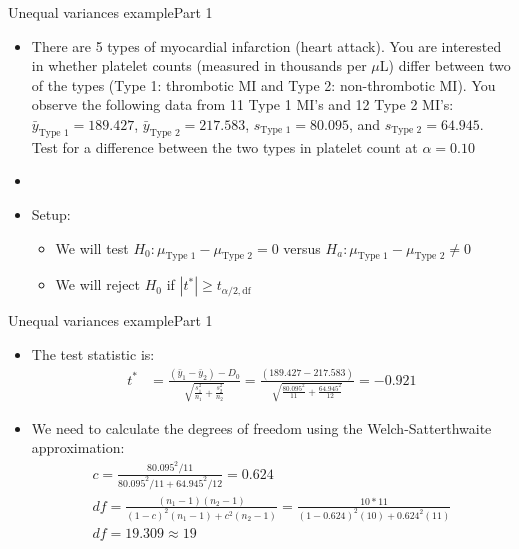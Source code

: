 \documentclass[xcolor=dvipsnames]{beamer}
\begin{document}
\begin{frame}{Unequal variances example}{Part 1}
	\begin{itemize}
		\item There are 5 types of myocardial infarction (heart attack). You are interested in whether platelet counts (measured in thousands per $\mu$L) differ between two of the types (Type 1: thrombotic MI and Type 2: non-thrombotic MI). You observe the following data from 11 Type 1 MI's and 12 Type 2 MI's: $\bar{y}_{\text{Type 1}}=189.427$, $\bar{y}_{\text{Type 2}}=217.583$, $s_{\text{Type 1}} = 80.095$, and $s_{\text{Type 2}} = 64.945$. Test for a difference between the two types in platelet count at $\alpha = 0.10$ \pause
		\item[]
		\item Setup:
		\begin{itemize}
			\item We will test $H_0: \mu_{\text{Type 1}} - \mu_{\text{Type 2}} =0$ versus $H_a: \mu_{\text{Type 1}} - \mu_{\text{Type 2}} \neq 0$ \pause
			\item We will reject $H_0$ if $|t^*| \geq t_{\alpha / 2, \text{df}}$
		\end{itemize}
	\end{itemize}
\end{frame}

\begin{frame}{Unequal variances example}{Part 1}
	\begin{itemize}
		\item The test statistic is: 
		\begin{align*}
		t^* &= \frac{(\bar{y}_1-\bar{y}_2)-D_0}{\sqrt{\frac{s^2_1}{n_1}+\frac{s^2_2}{n_2}}} = \frac{(189.427-217.583)}{\sqrt{\frac{80.095^2}{11}+\frac{64.945^2}{12}}} = -0.921
		\end{align*}\pause
		\item We need to calculate the degrees of freedom using the Welch-Satterthwaite approximation: \pause
		\begin{gather*}
			c = \frac{80.095^2 / 11}{80.095^2 / 11 + 64.945^2/12} = 0.624\\
			df = \frac{(n_1 -1)(n_2-1)}{(1-c)^2(n_1-1)+c^2(n_2-1)} = \frac{10*11}{(1-0.624)^2(10) + 0.624^2 (11)} \\
			df = 19.309 \approx 19
		\end{gather*}
	\end{itemize}
\end{frame}
\end{document}
